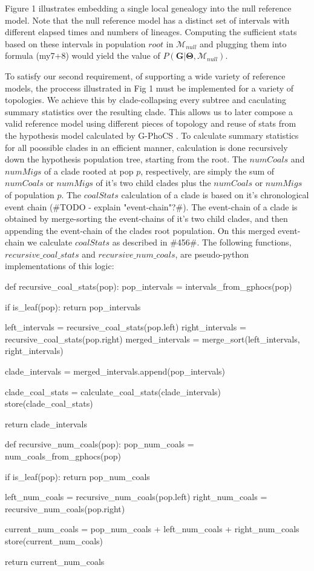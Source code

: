 \documentclass[11pt]{article}
\newcommand{\vect}[1]{\boldsymbol{\mathbf{#1}}}
\newcommand{\M}{\mathcal{M}}
\newcommand{\G}{\vect{G}}
\newcommand{\T}{\vect{\Theta}}
\newcommand{\Mnull}{\M_{null}}
\newcommand{\1}{\mathbbm{1}}
\newcommand{\gp}{G-PhoCS }
\begin{document}
Figure 1 illustrates embedding a single local genealogy into the null reference model. Note that the null reference model has a distinct set of intervals with different elapsed times and numbers of lineages. Computing the sufficient stats based on these intervals in population $root$  in $\Mnull$ and plugging them into formula (my7+8) would yield the value of $P(\G| \T,\Mnull)$.

To satisfy our second requirement, of supporting a wide variety of reference models, the proccess illustrated in Fig 1 must be implemented for a variety of topologies. We achieve this by clade-collapsing every subtree and caculating summary statistics over the resulting clade. This allows us to later compose a valid reference model using different pieces of topology and reuse of stats from the hypothesis model calculated by \gp.
%
To calculate summary statistics for all poossible clades in an efficient manner, calculation is done recursively down the hypothesis population tree, starting from the root. The $numCoals$ and $numMigs$ of a clade rooted at pop $p$, respectively, are simply the sum of $numCoals$ or $numMigs$ of it's two child clades plus the $numCoals$ or $numMigs$ of population $p$.
%
The $coalStats$ calculation of a clade is based on it's chronological event chain (\#TODO - explain "event-chain"?\#). The event-chain of a clade is obtained by merge-sorting the event-chains of it's two child clades, and then appending the event-chain of the clades root population. On this merged event-chain we calculate $coalStats$ as described in \#456\#. The following functions, $recursive\_coal\_stats$ and $recursive\_num\_coals$, are pseudo-python implementations of this logic:
%

\begin{python}

def recursive_coal_stats(pop):
    pop_intervals = intervals_from_gphocs(pop)
    
    if is_leaf(pop):
        return pop_intervals

    left_intervals = recursive_coal_stats(pop.left)
    right_intervals = recursive_coal_stats(pop.right)
    merged_intervals = merge_sort(left_intervals, right_intervals)

    clade_intervals = merged_intervals.append(pop_intervals)

    clade_coal_stats = calculate_coal_stats(clade_intervals)
    store(clade_coal_stats)

    return clade_intervals


def recursive_num_coals(pop):
    pop_num_coals = num_coals_from_gphocs(pop)

    if is_leaf(pop):
        return pop_num_coals

    left_num_coals = recursive_num_coals(pop.left)
    right_num_coals = recursive_num_coals(pop.right)

    current_num_coals = pop_num_coals + left_num_coals + right_num_coals
    store(current_num_coals)

    return current_num_coals

\end{python}
\end{document}

